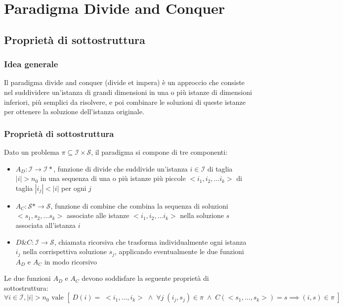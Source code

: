 \section{Paradigma Divide and Conquer}
\subsection{Proprietà di sottostruttura}
\subsubsection*{Idea generale}
Il paradigma divide and conquer (divide et impera) è un approccio che consiste nel suddividere un'istanza di grandi dimensioni
in una o più istanze di dimensioni inferiori, più semplici da risolvere, e poi combinare le soluzioni di queste istanze per
ottenere la soluzione dell'istanza originale.

\subsubsection*{Proprietà di sottostruttura}
Dato un problema \(\pi \subseteq \mathcal{I} \times \mathcal{S}\), il paradigma si compone di tre componenti:
\begin{itemize}[topsep=5pt, itemsep=3pt]
	\item \(A_D : \mathcal{I} \to \mathcal{I}*\), funzione di divide che suddivide un'istanza \(i \in \mathcal{I}\) di
	taglia \(|i| > n_0\) in una sequenza di una o più istanze più piccole \(<\!i_1, i_2, \dots i_k\!>\) di taglia
	\(|i_j| < |i|\) per ogni \(j\)
	\item \(A_C : \mathcal{S}* \to \mathcal{S}\), funzione di combine che combina la sequenza di soluzioni
	\(<\!s_1, s_2, \dots s_k\!>\) associate alle istanze \(<\!i_1, i_2, \dots i_k\!>\) nella soluzione \(s\) associata
	all'istanza \(i\)
	\item \(D\&C : \mathcal{I} \to \mathcal{S}\), chiamata ricorsiva che trasforma individualmente ogni istanza	\(i_j\)
	nella corrispettiva soluzione \(s_j\), applicando eventualmente le due funzioni \(A_D\) e \(A_C\) in modo ricorsivo
\end{itemize}

\noindent
Le due funzioni \(A_D\) e \(A_C\) devono soddisfare la seguente proprietà di sottostruttura:
\[\forall i \in \mathcal{I}, |i| > n_0 \text{ vale } \left[ \; D(i) = \; <\!i_1, \dots, i_k\!> \; \wedge \; \forall j \; (i_j, s_j) \in \pi \; \wedge \; C(<\!s_1, \dots, s_k\!>) = s \implies (i, s) \in \pi \; \right]\]

